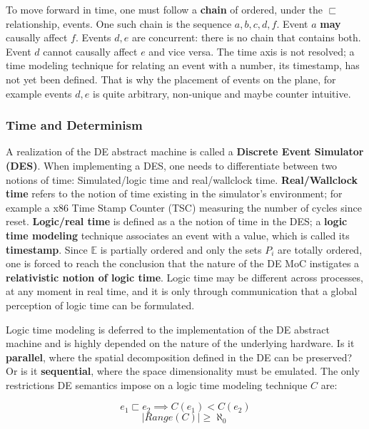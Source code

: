 \documentclass[11pt]{article}
\begin{document}
To move forward in time, one must follow a \textbf{chain} of ordered, under the \(\sqsubset\) relationship, events.
One such chain is the sequence \(a,b,c,d,f\).
Event \(a\) \textbf{may} causally affect \(f\).
Events \(d,e\) are concurrent: there is no chain that contains both.
Event \(d\) cannot causally affect \(e\) and vice versa.
The time axis is not resolved; a time modeling technique for relating an event with a number, its timestamp, has not yet been defined. 
That is why the placement of events on the plane, for example events \(d,e\) is quite arbitrary, non-unique and maybe counter intuitive.

\subsubsection{Time and Determinism}
\label{sec:org6b2a6ea}
A realization of the DE abstract machine is called a \textbf{Discrete Event Simulator (DES)}.
When implementing a DES, one needs to differentiate between two notions of time: Simulated/logic time and real/wallclock time.
\textbf{Real/Wallclock time} refers to the notion of time existing in the simulator's environment; for example a x86 Time Stamp Counter (TSC) measuring the number of cycles since reset.
\textbf{Logic/real time} is defined as a the notion of time in the DES; a \textbf{logic time modeling} technique associates an event with a value, which is called its \textbf{timestamp}.
Since \(\mathds{E}\) is partially ordered and only the sets \(P_i\) are totally ordered, one is forced to reach the conclusion that the nature of the DE MoC instigates a \textbf{relativistic notion of logic time}.
Logic time may be different across processes, at any moment in real time, and it is only through communication that a global perception of logic time can be formulated.

Logic time modeling is deferred to the implementation of the DE abstract machine and is highly depended on the nature of the underlying hardware. 
Is it \textbf{parallel}, where the spatial decomposition defined in the DE can be preserved? 
Or is it \textbf{sequential}, where the space dimensionality must be emulated.
The only restrictions DE semantics impose on a logic time modeling technique \(C\) are:

\begin{equation}
\tag{Axiom 5}
       e_1 \sqsubset e_2 \implies C(e_1) < C(e_2) 
\end{equation}
\begin{equation}
\tag{Axiom 6}
       |Range(C)| \geq \aleph_0
\end{equation}
\end{document}
